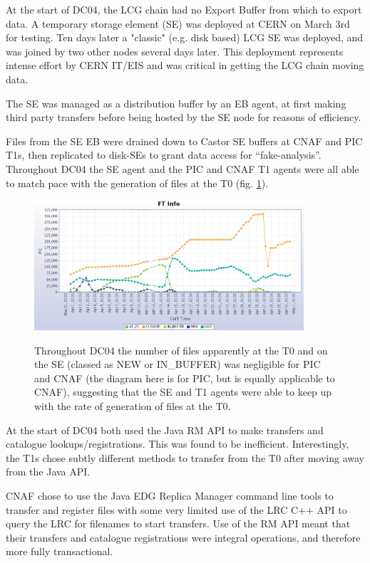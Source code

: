 \documentclass{cmspaper}
\begin{document}
At the start of DC04, the LCG chain had no Export Buffer from which to export data. A temporary storage element (SE) was deployed at CERN on March 3rd for testing. Ten days later a "classic" (e.g. disk based) LCG SE was deployed, and was joined by two other nodes several days later. This deployment represents intense effort by CERN IT/EIS and was critical in getting the LCG chain moving data.

The SE was managed as a distribution buffer by an EB agent, at first making third party transfers before being hosted by the SE node for reasons of efficiency.

Files from the SE EB were drained down to Castor SE buffers at CNAF and PIC T1s, then replicated to disk-SEs to grant data access for ``fake-analysis''. Throughout DC04 the SE agent and the PIC and CNAF T1 agents were all able to match pace with the generation of files at the T0 (fig. \ref{fig:PIC-FT}).

\begin{figure}[tbp]
\centering
\includegraphics[width=10cm]{PIC-FT.eps}
\label{fig:PIC-FT}
\caption{Throughout DC04 the number of files apparently at the T0 and on the SE (classed as NEW or IN\_BUFFER) was negligible for PIC and CNAF (the diagram here is for PIC, but is equally applicable to CNAF), suggesting that the SE and T1 agents were able to keep up with the rate of generation of files at the T0. }
\end{figure} 

At the start of DC04 both used the Java RM API to make transfers and catalogue lookups/registrations. This was found to be inefficient. Interestingly, the T1s chose subtly different methods to transfer from the T0 after moving away from the Java API.

CNAF chose to use the Java EDG Replica Manager command line tools to transfer and register files with some very limited use of the LRC C++ API to query the LRC for filenames to start transfers. Use of the RM API meant that their transfers and catalogue registrations were integral operations, and therefore more fully transactional. 
\end{document}
